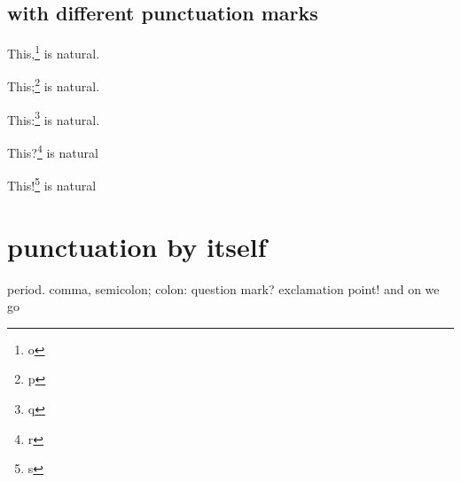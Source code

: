 \documentclass{snapshotmfo}
\begin{document}
\subsection{with different punctuation marks}

\noindent This,\footnote{o} is natural.

\noindent This;\footnote{p} is natural.

\noindent This:\footnote{q} is natural.

\noindent This?\footnote{r} is natural

\noindent This!\footnote{s} is natural


\section{punctuation by itself} 

period. comma, semicolon; colon: question mark? exclamation point! and on we go
\end{document}
